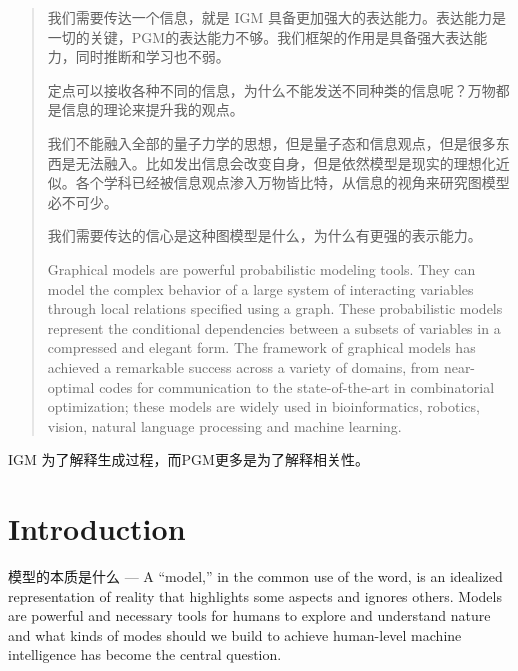 \documentclass{article}
\theoremstyle{definition}
\theoremstyle{remark}
\theoremstyle{definition}
\begin{document}
\begin{CJK*}{UTF8}{gbsn}
\begin{abstract}
    我们需要传达一个信息，就是 IGM 具备更加强大的表达能力。表达能力是一切的关键，PGM的表达能力不够。我们框架的作用是具备强大表达能力，同时推断和学习也不弱。
    
    
    定点可以接收各种不同的信息，为什么不能发送不同种类的信息呢？万物都是信息的理论来提升我的观点。
    
    
    我们不能融入全部的量子力学的思想，但是量子态和信息观点，但是很多东西是无法融入。比如发出信息会改变自身，但是依然模型是现实的理想化近似。各个学科已经被信息观点渗入万物皆比特，从信息的视角来研究图模型必不可少。
    
    
    我们需要传达的信心是这种图模型是什么，为什么有更强的表示能力。
    
    Graphical models are powerful probabilistic modeling tools. They can model the complex behavior of a large system of interacting variables through local relations specified using a graph. These probabilistic models represent the conditional dependencies between a subsets of variables in a compressed and elegant form. The framework of graphical models has achieved a remarkable success across a variety of domains, from near-optimal codes for communication to the state-of-the-art in combinatorial optimization; these models are widely used in bioinformatics, robotics, vision, natural language processing and machine learning. 

\end{abstract}

IGM 为了解释生成过程，而PGM更多是为了解释相关性。

\tableofcontents

\section{Introduction}



模型的本质是什么 ---
A “model,” in the common use of the word, is an idealized representation of reality that highlights some aspects and ignores others\cite{Pearl2009}.
Models are powerful and necessary tools for humans to explore and understand nature and what kinds of modes should we build to achieve human-level machine intelligence has become the central question.


\end{CJK*}
\end{document}
